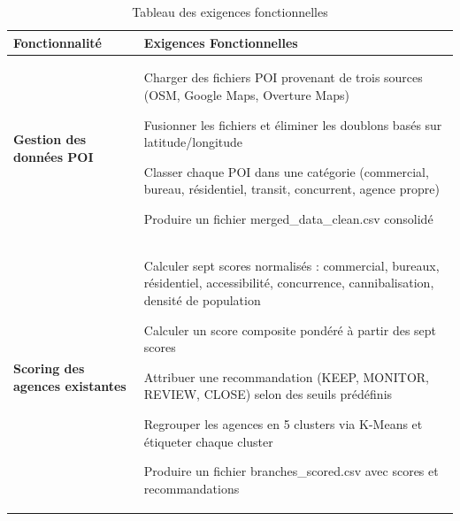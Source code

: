 \documentclass[11pt,a4paper,twoside]{report}
\begin{document}
\begingroup
\small
\renewcommand{\arraystretch}{1.1}
\begin{longtable}{|p{3.5cm}|p{10.5cm}|}
\caption{Tableau des exigences fonctionnelles} \label{tab:ef} \\
\hline
\textbf{Fonctionnalité} & \textbf{Exigences Fonctionnelles} \\
\hline
\endfirsthead

\endhead
\hline
\endlastfoot

\textbf{Gestion des données POI} &
\begin{tblitem}
    \item Charger des fichiers POI provenant de trois sources (OSM, Google Maps, Overture Maps)
    \item Fusionner les fichiers et éliminer les doublons basés sur latitude/longitude
    \item Classer chaque POI dans une catégorie (commercial, bureau, résidentiel, transit, concurrent, agence propre)
    \item Produire un fichier merged\_data\_clean.csv consolidé
\end{tblitem} \\
\hline

\textbf{Scoring des agences existantes} &
\begin{tblitem}
    \item Calculer sept scores normalisés : commercial, bureaux, résidentiel, accessibilité, concurrence, cannibalisation, densité de population
    \item Calculer un score composite pondéré à partir des sept scores
    \item Attribuer une recommandation (KEEP, MONITOR, REVIEW, CLOSE) selon des seuils prédéfinis
    \item Regrouper les agences en 5 clusters via K-Means et étiqueter chaque cluster
    \item Produire un fichier branches\_scored.csv avec scores et recommandations
\end{tblitem} \\
\hline


\end{longtable}
\end{document}
